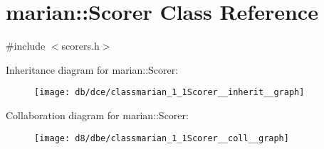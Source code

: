 \hypertarget{classmarian_1_1Scorer}{}\section{marian\+:\+:Scorer Class Reference}
\label{classmarian_1_1Scorer}


{\ttfamily \#include $<$scorers.\+h$>$}



Inheritance diagram for marian\+:\+:Scorer\+:
\nopagebreak
\begin{figure}[H]
\begin{center}
\leavevmode
\texttt{[image: db/dce/classmarian\_1\_1Scorer\_\_inherit\_\_graph]}
\end{center}
\end{figure}


Collaboration diagram for marian\+:\+:Scorer\+:
\nopagebreak
\begin{figure}[H]
\begin{center}
\leavevmode
\texttt{[image: d8/dbe/classmarian\_1\_1Scorer\_\_coll\_\_graph]}
\end{center}
\end{figure}
